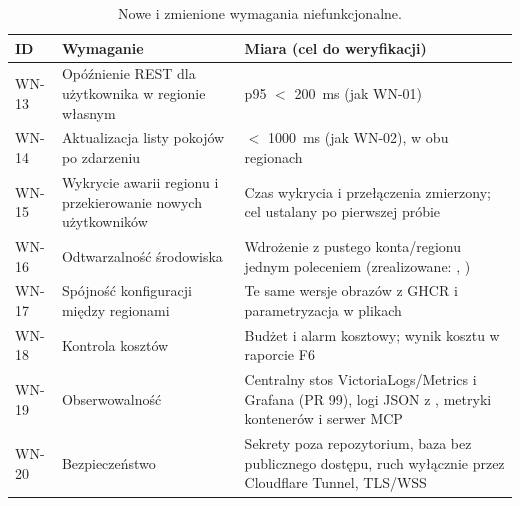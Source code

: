 \begin{table}[H]
\centering\small
\begin{tabularx}{\textwidth}{@{}lYY@{}}
\toprule
\textbf{ID} & \textbf{Wymaganie} & \textbf{Miara (cel do weryfikacji)} \\
\midrule
WN-13 & Opóźnienie REST dla użytkownika w regionie własnym & p95 $<$ 200~ms (jak WN-01) \\
WN-14 & Aktualizacja listy pokojów po zdarzeniu & $<$ 1000~ms (jak WN-02), w obu regionach \\
WN-15 & Wykrycie awarii regionu i przekierowanie nowych użytkowników & Czas wykrycia i przełączenia zmierzony; cel ustalany po pierwszej próbie \\
WN-16 & Odtwarzalność środowiska & Wdrożenie z pustego konta/regionu jednym poleceniem (zrealizowane: , ) \\
WN-17 & Spójność konfiguracji między regionami & Te same wersje obrazów z GHCR i parametryzacja w plikach  \\
WN-18 & Kontrola kosztów & Budżet i alarm kosztowy; wynik kosztu w raporcie F6 \\
WN-19 & Obserwowalność & Centralny stos VictoriaLogs/Metrics i Grafana (PR 99), logi JSON z , metryki kontenerów i serwer MCP \\
WN-20 & Bezpieczeństwo & Sekrety poza repozytorium, baza bez publicznego dostępu, ruch wyłącznie przez Cloudflare Tunnel, TLS/WSS \\
\bottomrule
\end{tabularx}
\caption{Nowe i zmienione wymagania niefunkcjonalne.}
\end{table}

